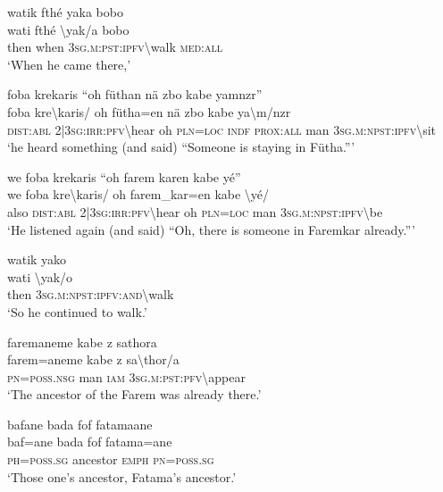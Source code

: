 \ea\label{ex:1:a3743}
watik fthé yaka bobo\\
\gll wati	fthé	{\textbackslash}yak/a	bobo\\
     then	when	3\textsc{sg}.\textsc{m}:\textsc{pst}:\textsc{ipfv}{\textbackslash}walk	\textsc{med}:\textsc{all}\\
\glt `When he came there,'
\z

\ea\label{ex:1:a3744}
foba krekaris ``oh füthan nä zbo kabe yamnzr''\\
\gll foba	kre{\textbackslash}karis/	oh	fütha=en	nä	zbo	kabe	ya{\textbackslash}m/nzr\\
     \textsc{dist}:\textsc{abl}	2|3\textsc{sg}:\textsc{irr}:\textsc{pfv}{\textbackslash}hear	oh	\textsc{pln}=\textsc{loc}	\textsc{indf}	\textsc{prox}:\textsc{all}	man	3\textsc{sg}.\textsc{m}:\textsc{npst}:\textsc{ipfv}{\textbackslash}sit\\
\glt `he heard something (and said) ``Someone is staying in Fütha.'''
\z

\ea\label{ex:1:a3745}
we foba krekaris ``oh farem karen kabe yé''\\
\gll we	foba	kre{\textbackslash}karis/	oh	farem\_kar=en	kabe	{\textbackslash}yé/\\
     also	\textsc{dist}:\textsc{abl}	2|3\textsc{sg}:\textsc{irr}:\textsc{pfv}{\textbackslash}hear	oh	\textsc{pln}=\textsc{loc}	man	3\textsc{sg}.\textsc{m}:\textsc{npst}:\textsc{ipfv}{\textbackslash}be\\
\glt `He listened again (and said) ``Oh, there is someone in Faremkar already.'''
\z

\ea\label{ex:1:a3747}
watik yako\\
\gll wati	{\textbackslash}yak/o\\
     then	3\textsc{sg}.\textsc{m}:\textsc{npst}:\textsc{ipfv}:\textsc{and}{\textbackslash}walk\\
\glt `So he continued to walk.'
\z

\ea\label{ex:1:a3748}
faremaneme kabe z sathora\\
\gll farem=aneme	kabe	z	sa{\textbackslash}thor/a\\
     \textsc{pn}=\textsc{poss}.\textsc{nsg}	man	\textsc{iam}	3\textsc{sg}.\textsc{m}:\textsc{pst}:\textsc{pfv}{\textbackslash}appear\\
\glt `The ancestor of the Farem was already there.'
\z

\ea\label{ex:1:a3750}
bafane bada fof fatamaane\\
\gll baf=ane	bada	fof	fatama=ane\\
     \textsc{ph}=\textsc{poss}.\textsc{sg}	ancestor	\textsc{emph}	\textsc{pn}=\textsc{poss}.\textsc{sg}\\
\glt `Those one's ancestor, Fatama's ancestor.'
\z

